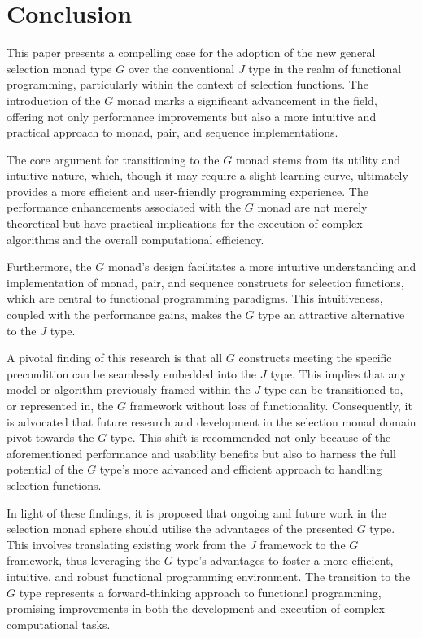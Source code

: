 \documentclass[runningheads]{llncs}
\begin{document}
\section{Conclusion}\label{conclusion}

This paper presents a compelling case for the adoption of the new
general selection monad type \(G\) over the conventional \(J\) type in
the realm of functional programming, particularly within the context of
selection functions. The introduction of the \(G\) monad marks a
significant advancement in the field, offering not only performance
improvements but also a more intuitive and practical approach to monad,
pair, and sequence implementations.

\qquad The core argument for transitioning to the \(G\) monad stems from
its utility and intuitive nature, which, though it may require a slight
learning curve, ultimately provides a more efficient and user-friendly
programming experience. The performance enhancements associated with the
\(G\) monad are not merely theoretical but have practical implications
for the execution of complex algorithms and the overall computational
efficiency.

\qquad Furthermore, the \(G\) monad's design facilitates a more
intuitive understanding and implementation of monad, pair, and sequence
constructs for selection functions, which are central to functional
programming paradigms. This intuitiveness, coupled with the performance
gains, makes the \(G\) type an attractive alternative to the \(J\) type.

\qquad A pivotal finding of this research is that all \(G\) constructs
meeting the specific precondition can be seamlessly embedded into the
\(J\) type. This implies that any model or algorithm previously framed
within the \(J\) type can be transitioned to, or represented in, the
\(G\) framework without loss of functionality. Consequently, it is
advocated that future research and development in the selection monad
domain pivot towards the \(G\) type. This shift is recommended not only
because of the aforementioned performance and usability benefits but
also to harness the full potential of the \(G\) type's more advanced and
efficient approach to handling selection functions.

\qquad In light of these findings, it is proposed that ongoing and
future work in the selection monad sphere should utilise the advantages
of the presented \(G\) type. This involves translating existing work
from the \(J\) framework to the \(G\) framework, thus leveraging the
\(G\) type's advantages to foster a more efficient, intuitive, and
robust functional programming environment. The transition to the \(G\)
type represents a forward-thinking approach to functional programming,
promising improvements in both the development and execution of complex
computational tasks.
\end{document}
